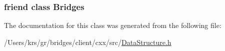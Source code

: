 \subsubsection[{Bridges}]{\setlength{\rightskip}{0pt plus 5cm}friend class {\bf Bridges}\hspace{0.3cm}{\ttfamily [friend]}}\label{classbridges_1_1_data_structure_a1e7012f84e4df45aa77f36ad8d8375eb}


The documentation for this class was generated from the following file\+:\begin{DoxyCompactItemize}
\item 
/\+Users/krs/gr/bridges/client/cxx/src/\hyperlink{_data_structure_8h}{Data\+Structure.\+h}\end{DoxyCompactItemize}
